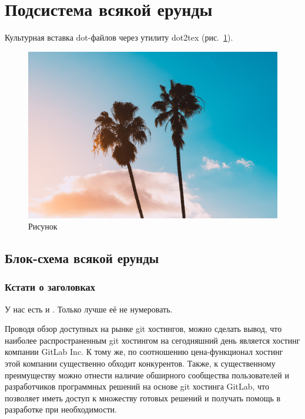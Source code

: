 \section{Подсистема всякой ерунды}

Культурная вставка dot-файлов через утилиту dot2tex (рис.~\ref{fig:fig02}).

\begin{figure}
    \centering
    \includegraphics{figures/pic01}
    \caption{Рисунок}
    \label{fig:fig02}
\end{figure}


\subsection{Блок-схема всякой ерунды}

\subsubsection*{Кстати о заголовках}

У нас есть и . Только лучше её не нумеровать.

Проводя обзор доступных на рынке git хостингов, можно сделать вывод, что наиболее распространенным git хостингом на сегодняшний день является хостинг компании GitLab Inc.
К тому же, по соотношению цена-функционал хостинг этой компании существенно обходит конкурентов.
Также, к существенному преимуществу можно отнести наличие обширного сообщества пользователей и разработчиков программных решений на основе git хостинга GitLab,
что позволяет иметь доступ к множеству готовых решений и получать помощь в разработке при необходимости.

